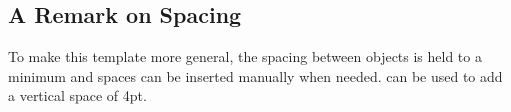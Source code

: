 \documentclass[\fontheight]{extarticle}
\begin{document}
\begin{multicols*}{3}
    \section{A Remark on Spacing}
    To make this template more general, the spacing between objects is held to a minimum and spaces can be inserted manually when needed.
     can be used to add a vertical space of 4pt.


\end{multicols*}
\end{document}
